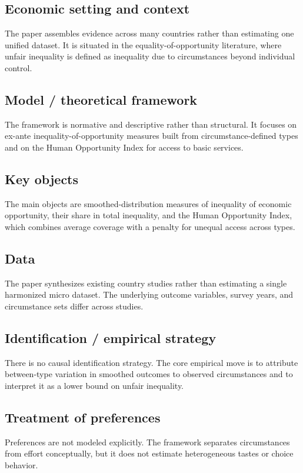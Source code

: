 \documentclass[11pt,a4paper]{article}
\begin{document}
\subsection*{Economic setting and context}
The paper assembles evidence across many countries rather than estimating one unified dataset. It is situated in the equality-of-opportunity literature, where unfair inequality is defined as inequality due to circumstances beyond individual control.

\subsection*{Model / theoretical framework}
The framework is normative and descriptive rather than structural. It focuses on ex-ante inequality-of-opportunity measures built from circumstance-defined types and on the Human Opportunity Index for access to basic services.

\subsection*{Key objects}
The main objects are smoothed-distribution measures of inequality of economic opportunity, their share in total inequality, and the Human Opportunity Index, which combines average coverage with a penalty for unequal access across types.

\subsection*{Data}
The paper synthesizes existing country studies rather than estimating a single harmonized micro dataset. The underlying outcome variables, survey years, and circumstance sets differ across studies.

\subsection*{Identification / empirical strategy}
There is no causal identification strategy. The core empirical move is to attribute between-type variation in smoothed outcomes to observed circumstances and to interpret it as a lower bound on unfair inequality.

\subsection*{Treatment of preferences}
Preferences are not modeled explicitly. The framework separates circumstances from effort conceptually, but it does not estimate heterogeneous tastes or choice behavior.
\end{document}
